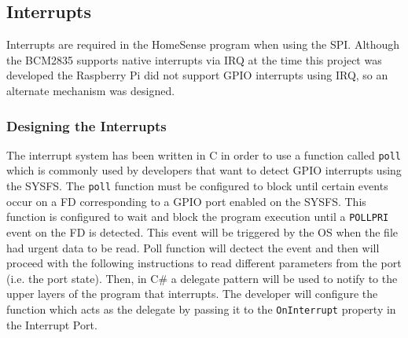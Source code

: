 \subsection{Interrupts}\label{SS:IOSharp-Interrupt}
Interrupts are required in the HomeSense program when using the \gls{SPI}. Although the \gls{BCM2835} supports native interrupts via \gls{IRQ} at the time this project was developed the Raspberry Pi did not support GPIO interrupts using \gls{IRQ}, so an alternate mechanism was designed.

\subsubsection{Designing the Interrupts}\label{SSS:IOSharp-Interrupt-Design}
The interrupt system has been written in C in order to use a function called \verb!poll! which is commonly used by developers that want to detect GPIO interrupts using the SYSFS. The \verb!poll! function must be configured to block until certain events occur on a \gls{FD} corresponding to a GPIO port enabled on the SYSFS. This function is configured to wait and block the program execution until a \verb!POLLPRI! event on the \gls{FD} is detected. This event will be triggered by the OS when the file had urgent data to be read. Poll function will dectect the event and then will proceed with the following instructions to read different parameters from the port (i.e. the port state). Then, in C\# a delegate pattern will be used to notify to the upper layers of the program that interrupts. The developer will configure the function which acts as the delegate by passing it to the \verb!OnInterrupt! property in the Interrupt Port.

